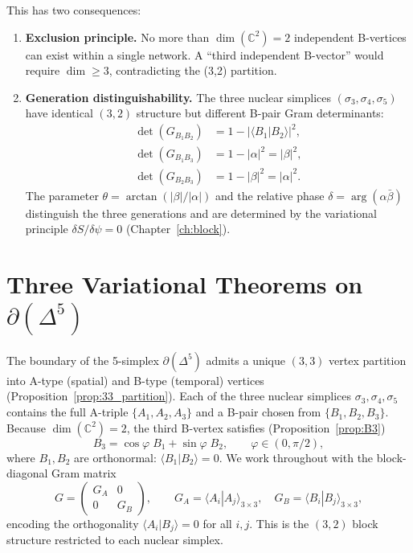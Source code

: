 \documentclass[12pt]{article}
\theoremstyle{remark}
\theoremstyle{definition}
\newcommand{\CC}{\mathbb{C}}
\begin{document}
This has two consequences:
\begin{enumerate}
\item \textbf{Exclusion principle.}  No more than $\dim(\CC^2) = 2$ independent B-vertices can exist within a single network.  A ``third independent B-vector'' would require $\dim \geq 3$, contradicting the (3,2) partition.

\item \textbf{Generation distinguishability.}  The three nuclear simplices $(\sigma_3, \sigma_4, \sigma_5)$ have identical $(3,2)$ structure but different B-pair Gram determinants:
\begin{align}
\det(G_{B_1 B_2}) &= 1 - |\langle B_1 | B_2 \rangle|^2, \\
\det(G_{B_1 B_3}) &= 1 - |\alpha|^2 = |\beta|^2, \\
\det(G_{B_2 B_3}) &= 1 - |\beta|^2 = |\alpha|^2.
\end{align}
The parameter $\theta = \arctan(|\beta|/|\alpha|)$ and the relative phase $\delta = \arg(\alpha\bar\beta)$ distinguish the three generations and are determined by the variational principle $\delta S / \delta\psi = 0$ (Chapter~\ref{ch:block}).
\end{enumerate}



\section{Three Variational Theorems on $\partial(\Delta^5)$}
\label{ch:variational_theorems}

The boundary of the 5-simplex $\partial(\Delta^5)$ admits a unique
$(3,3)$ vertex partition into A-type (spatial) and B-type (temporal)
vertices (Proposition~\ref{prop:33_partition}).  Each of the three
nuclear simplices $\sigma_3, \sigma_4, \sigma_5$ contains the full
A-triple $\{A_1, A_2, A_3\}$ and a B-pair chosen from
$\{B_1, B_2, B_3\}$.  Because $\dim(\CC^2) = 2$, the third B-vertex
satisfies (Proposition~\ref{prop:B3})
\begin{equation}\label{eq:B3_parametrize}
B_3 = \cos\varphi\; B_1 + \sin\varphi\; B_2,
\qquad \varphi \in (0, \pi/2),
\end{equation}
where $B_1, B_2$ are orthonormal: $\langle B_1 | B_2 \rangle = 0$.
We work throughout with the block-diagonal Gram matrix
\begin{equation}\label{eq:block_gram}
G = \begin{pmatrix} G_A & 0 \\ 0 & G_B \end{pmatrix},
\qquad
G_A = \langle A_i | A_j \rangle_{3\times 3},
\quad
G_B = \langle B_i | B_j \rangle_{3\times 3},
\end{equation}
encoding the orthogonality $\langle A_i | B_j \rangle = 0$ for all
$i, j$.  This is the $(3,2)$ block structure restricted to each
nuclear simplex.
\end{document}
